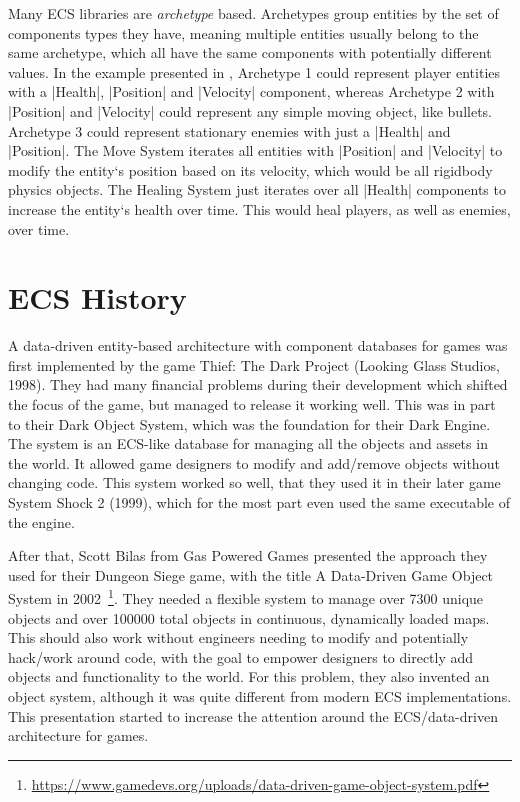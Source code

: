 Many ECS libraries are \textit{archetype} based. Archetypes group entities by the set of components types they have, meaning multiple entities usually belong to the same archetype, which all have the same components with potentially different values. In the example presented in , \textsf{Archetype 1} could represent player entities with a |Health|, |Position| and |Velocity| component, whereas \textsf{Archetype 2} with |Position| and |Velocity| could represent any simple moving object, like bullets. \textsf{Archetype 3} could represent stationary enemies with just a |Health| and |Position|. The \textsf{Move System} iterates all entities with |Position| and |Velocity| to modify the entity`s position based on its velocity, which would be all rigidbody physics objects. The \textsf{Healing System} just iterates over all |Health| components to increase the entity`s health over time. This would heal players, as well as enemies, over time.

\section{ECS History}

A data-driven entity-based architecture with component databases for games was first implemented by the game \textsf{Thief: The Dark Project} (Looking Glass Studios, 1998). They had many financial problems during their development which shifted the focus of the game, but managed to release it working well. This was in part to their \textsf{Dark Object System}, which was the foundation for their \textsf{Dark Engine}. The system is an ECS-like database for managing all the objects and assets in the world. It allowed game designers to modify and add/remove objects without changing code. This system worked so well, that they used it in their later game \textsf{System Shock 2} (1999), which for the most part even used the same executable of the engine.

After that, Scott Bilas from \textsf{Gas Powered Games} presented the approach they used for their \textsf{Dungeon Siege} game, with the title \textsf{A Data-Driven Game Object System} in 2002~\footnote{\url{https://www.gamedevs.org/uploads/data-driven-game-object-system.pdf}}. They needed a flexible system to manage over 7300 unique objects and over 100000 total objects in continuous, dynamically loaded maps. This should also work without engineers needing to modify and potentially hack/work around code, with the goal to empower designers to directly add objects and functionality to the world. For this problem, they also invented an object system, although it was quite different from modern ECS implementations. This presentation started to increase the attention around the ECS/data-driven architecture for games.

